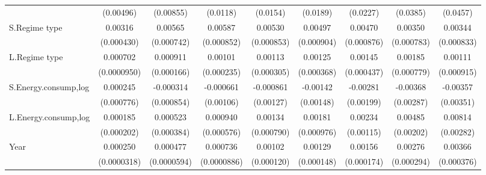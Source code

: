 \begin{table}[htbp]
\begin{tabular}{l*{8}{c}}
                    &   (0.00496)         &   (0.00855)         &    (0.0118)         &    (0.0154)         &    (0.0189)         &    (0.0227)         &    (0.0385)         &    (0.0457)         \\
[1em]
S.Regime type       &     0.00316\sym{***}&     0.00565\sym{***}&     0.00587\sym{***}&     0.00530\sym{***}&     0.00497\sym{***}&     0.00470\sym{***}&     0.00350\sym{***}&     0.00344\sym{***}\\
                    &  (0.000430)         &  (0.000742)         &  (0.000852)         &  (0.000853)         &  (0.000904)         &  (0.000876)         &  (0.000783)         &  (0.000833)         \\
[1em]
L.Regime type       &    0.000702\sym{***}&    0.000911\sym{***}&     0.00101\sym{***}&     0.00113\sym{***}&     0.00125\sym{***}&     0.00145\sym{***}&     0.00185\sym{**} &     0.00111         \\
                    & (0.0000950)         &  (0.000166)         &  (0.000235)         &  (0.000305)         &  (0.000368)         &  (0.000437)         &  (0.000779)         &  (0.000915)         \\
[1em]
S.Energy.consump,log&    0.000245         &   -0.000314         &   -0.000661         &   -0.000861         &    -0.00142         &    -0.00281         &    -0.00368         &    -0.00357         \\
                    &  (0.000776)         &  (0.000854)         &   (0.00106)         &   (0.00127)         &   (0.00148)         &   (0.00199)         &   (0.00287)         &   (0.00351)         \\
[1em]
L.Energy.consump,log&    0.000185         &    0.000523         &    0.000940         &     0.00134\sym{*}  &     0.00181\sym{*}  &     0.00234\sym{**} &     0.00485\sym{**} &     0.00814\sym{***}\\
                    &  (0.000202)         &  (0.000384)         &  (0.000576)         &  (0.000790)         &  (0.000976)         &   (0.00115)         &   (0.00202)         &   (0.00282)         \\
[1em]
Year                &    0.000250\sym{***}&    0.000477\sym{***}&    0.000736\sym{***}&     0.00102\sym{***}&     0.00129\sym{***}&     0.00156\sym{***}&     0.00276\sym{***}&     0.00366\sym{***}\\
                    & (0.0000318)         & (0.0000594)         & (0.0000886)         &  (0.000120)         &  (0.000148)         &  (0.000174)         &  (0.000294)         &  (0.000376)         \\

\end{tabular}
\end{table}
